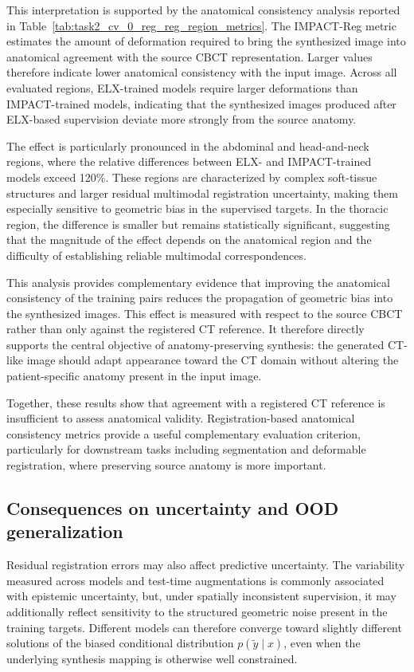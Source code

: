 \documentclass[lettersize,journal]{IEEEtran}
\begin{document}
This interpretation is supported by the anatomical consistency analysis reported in Table~\ref{tab:task2_cv_0_reg_reg_region_metrics}. The IMPACT-Reg metric estimates the amount of deformation required to bring the synthesized image into anatomical agreement with the source CBCT representation. Larger values therefore indicate lower anatomical consistency with the input image. Across all evaluated regions, ELX-trained models require larger deformations than IMPACT-trained models, indicating that the synthesized images produced after ELX-based supervision deviate more strongly from the source anatomy.

The effect is particularly pronounced in the abdominal and head-and-neck regions, where the relative differences between ELX- and IMPACT-trained models exceed 120\%. These regions are characterized by complex soft-tissue structures and larger residual multimodal registration uncertainty, making them especially sensitive to geometric bias in the supervised targets. In the thoracic region, the difference is smaller but remains statistically significant, suggesting that the magnitude of the effect depends on the anatomical region and the difficulty of establishing reliable multimodal correspondences.

This analysis provides complementary evidence that improving the anatomical consistency of the training pairs reduces the propagation of geometric bias into the synthesized images. This effect is measured with respect to the source CBCT rather than only against the registered CT reference. It therefore directly supports the central objective of anatomy-preserving synthesis: the generated CT-like image should adapt appearance toward the CT domain without altering the patient-specific anatomy present in the input image.

Together, these results show that agreement with a registered CT reference is insufficient to assess anatomical validity. Registration-based anatomical consistency metrics provide a useful complementary evaluation criterion, particularly for downstream tasks including segmentation and deformable registration, where preserving source anatomy is more important.

\subsection{Consequences on uncertainty and OOD generalization}

Residual registration errors may also affect predictive uncertainty. The variability measured across models and test-time augmentations is commonly associated with epistemic uncertainty, but, under spatially inconsistent supervision, it may additionally reflect sensitivity to the structured geometric noise present in the training targets. Different models can therefore converge toward slightly different solutions of the biased conditional distribution $p(\tilde{y}\mid x)$, even when the underlying synthesis mapping is otherwise well constrained. 
\end{document}
